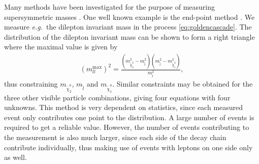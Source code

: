\documentclass[twoside,english]{uiofysmaster}
\begin{document}
Many methods have been investigated for the purpose of measuring supersymmetric masses \cite{Barr:2010zj}. One well known example is the end-point method \cite{1126-6708-2000-09-004}. We measure {\it e.g.}\ the dilepton invariant mass in the process \eqref{eq:goldencascade}. The distribution of the dilepton invariant mass can be shown to form a right triangle where the maximal value is given by
\begin{align}
	(m_{ll}^\mathrm{max})^2 = \frac{ \left( m^2_{\tilde{\chi}_2^0} - m^2_{\tilde{l}} \right) \left( m^2_{\tilde{l}} - m^2_{\tilde{\chi}_1^0} \right)}{m^2_{\tilde{l}}}, \label{eq:invariant_mass_endpoint}
\end{align}
thus constraining $m_{\tilde{\chi}_2^0}$, $m_{\tilde{l}}$ and $m_{\tilde{\chi}_1^0}$. Similar constraints may be obtained for the three other visible particle combinations, giving four equations with four unknowns. This method is very dependent on statistics, since each measured event only contributes one point to the distribution. A large number of events is required to get a reliable value. However, the number of events contributing to the measurement is also much larger, since each side of the decay chain contribute individually, thus making use of events with leptons on one side only as well.
\end{document}
